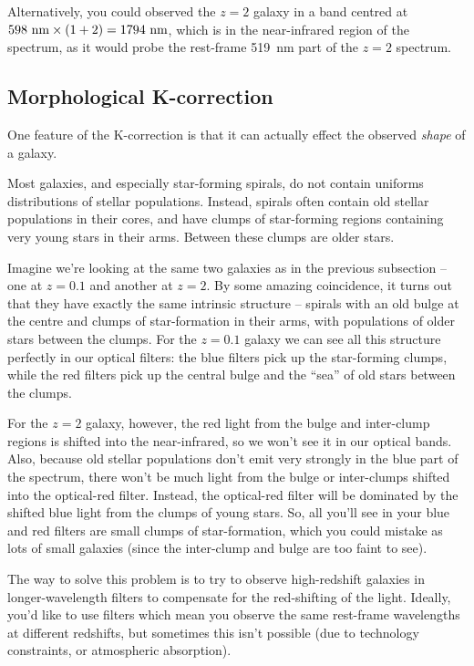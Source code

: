 \documentclass[11pt]{article}
\begin{document}
Alternatively, you could observed the $z=2$ galaxy in a band centred
at $598~{\rm nm}\times(1+2)=1794~{\rm nm}$, which is in the
near-infrared region of the spectrum, as it would probe the rest-frame
519~nm part of the $z=2$ spectrum.

\subsection{Morphological K-correction}
One feature of the K-correction is that it can actually effect the
observed {\it shape} of a galaxy.

Most galaxies, and especially star-forming spirals, do not contain
uniforms distributions of stellar populations. Instead, spirals often
contain old stellar populations in their cores, and have clumps of
star-forming regions containing very young stars in their
arms. Between these clumps are older stars.

Imagine we're looking at the same two galaxies as in the previous
subsection -- one at $z=0.1$ and another at $z=2$. By some amazing
coincidence, it turns out that they have exactly the same intrinsic
structure -- spirals with an old bulge at the centre and clumps of
star-formation in their arms, with populations of older stars between
the clumps. For the $z=0.1$ galaxy we can see all this structure
perfectly in our optical filters: the blue filters pick up the
star-forming clumps, while the red filters pick up the central bulge
and the ``sea'' of old stars between the clumps.

For the $z=2$ galaxy, however, the red light from the bulge and
inter-clump regions is shifted into the near-infrared, so we won't see
it in our optical bands. Also, because old stellar populations don't
emit very strongly in the blue part of the spectrum, there won't be
much light from the bulge or inter-clumps shifted into the optical-red
filter. Instead, the optical-red filter will be dominated by the
shifted blue light from the clumps of young stars. So, all you'll see
in your blue and red filters are small clumps of star-formation, which
you could mistake as lots of small galaxies (since the inter-clump and
bulge are too faint to see).

The way to solve this problem is to try to observe high-redshift
galaxies in longer-wavelength filters to compensate for the
red-shifting of the light. Ideally, you'd like to use filters which
mean you observe the same rest-frame wavelengths at different
redshifts, but sometimes this isn't possible (due to technology
constraints, or atmospheric absorption).
\end{document}
